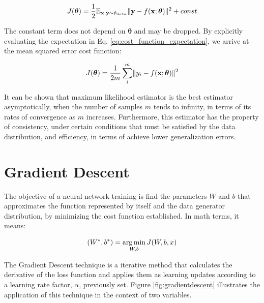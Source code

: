 \begin{equation}
J(\boldsymbol{\theta}) = \frac{1}{2}\mathbb{E}_{\bvec{x},\bvec{y}\sim \hat{p}_{data}} \lVert \bvec{y} - f (\bvec{x}; \boldsymbol{\theta}) \rVert ^{2} + const
\label{eq:cost_function_expectation}
\end{equation} 

The constant term does not depend on \( \boldsymbol{\theta} \) and may be dropped. By explicitly evaluating the expectation in Eq. \eqref{eq:cost_function_expectation}, we arrive at the mean squared error cost function:

\begin{equation}
J(\boldsymbol{\theta}) = \frac{1}{2m} \sum^{m}_{i} \lVert y_{i} - f (\mathrm{\mathbf{x}}; \boldsymbol{\theta}) \rVert ^{2}
\end{equation}

It can be shown that maximum likelihood estimator is the best estimator asymptotically, when the number of samples $m$ tends to infinity, in terms of its rates of convergence as $m$ increases. Furthermore, this estimator has the property of consistency, under certain conditions that must be satisfied by the data distribution, and efficiency, in terms of achieve lower generalization errors.	

\section{Gradient Descent}\label{gradientdescent}

The objective of a neural network training is find the parameters $W$ and $b$ that approximates the function represented by itself and the data generator distribution, by minimizing the cost function established. In math terms, it means:

\begin{equation}
(W^{*},b^{*}) = \operatorname*{arg\,min}_{W,b}J(W, b, x)
\end{equation}


The Gradient Descent technique is a iterative method that calculates the derivative of the loss function and applies them as learning updates according to a learning rate factor, $\alpha$, previously set. Figure \ref{fig:gradientdescent} illustrates the application of this technique in the context of two variables.

